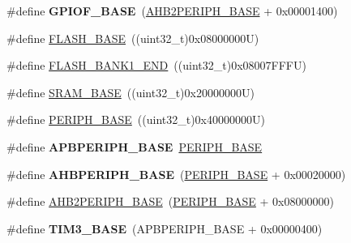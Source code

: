 \begin{DoxyCompactItemize}
\item 
\mbox{\label{group___peripheral__memory__map_ga7f9a3f4223a1a784af464a114978d26e}} 
\#define {\bfseries G\+P\+I\+O\+F\+\_\+\+B\+A\+SE}~(\hyperlink{group___peripheral__memory__map_gaeedaa71d22a1948492365e2cd26cfd46}{A\+H\+B2\+P\+E\+R\+I\+P\+H\+\_\+\+B\+A\+SE} + 0x00001400)
\item 
\#define \hyperlink{group___peripheral__memory__map_ga23a9099a5f8fc9c6e253c0eecb2be8db}{F\+L\+A\+S\+H\+\_\+\+B\+A\+SE}~((uint32\+\_\+t)0x08000000\+U)
\item 
\#define \hyperlink{group___peripheral__memory__map_ga443a2786535d83e32dfdc2b29e379332}{F\+L\+A\+S\+H\+\_\+\+B\+A\+N\+K1\+\_\+\+E\+ND}~((uint32\+\_\+t)0x08007\+F\+F\+F\+U)
\item 
\#define \hyperlink{group___peripheral__memory__map_ga05e8f3d2e5868754a7cd88614955aecc}{S\+R\+A\+M\+\_\+\+B\+A\+SE}~((uint32\+\_\+t)0x20000000\+U)
\item 
\#define \hyperlink{group___peripheral__memory__map_ga9171f49478fa86d932f89e78e73b88b0}{P\+E\+R\+I\+P\+H\+\_\+\+B\+A\+SE}~((uint32\+\_\+t)0x40000000\+U)
\item 
\mbox{\label{group___peripheral__memory__map_gac85f31889eb6a3f651b563bbc7131f91}} 
\#define {\bfseries A\+P\+B\+P\+E\+R\+I\+P\+H\+\_\+\+B\+A\+SE}~\hyperlink{group___peripheral__memory__map_ga9171f49478fa86d932f89e78e73b88b0}{P\+E\+R\+I\+P\+H\+\_\+\+B\+A\+SE}
\item 
\mbox{\label{group___peripheral__memory__map_ga92eb5d49730765d2abd0f5b09548f9f5}} 
\#define {\bfseries A\+H\+B\+P\+E\+R\+I\+P\+H\+\_\+\+B\+A\+SE}~(\hyperlink{group___peripheral__memory__map_ga9171f49478fa86d932f89e78e73b88b0}{P\+E\+R\+I\+P\+H\+\_\+\+B\+A\+SE} + 0x00020000)
\item 
\#define \hyperlink{group___peripheral__memory__map_gaeedaa71d22a1948492365e2cd26cfd46}{A\+H\+B2\+P\+E\+R\+I\+P\+H\+\_\+\+B\+A\+SE}~(\hyperlink{group___peripheral__memory__map_ga9171f49478fa86d932f89e78e73b88b0}{P\+E\+R\+I\+P\+H\+\_\+\+B\+A\+SE} + 0x08000000)
\item 
\mbox{\label{group___peripheral__memory__map_gaf0c34a518f87e1e505cd2332e989564a}} 
\#define {\bfseries T\+I\+M3\+\_\+\+B\+A\+SE}~(A\+P\+B\+P\+E\+R\+I\+P\+H\+\_\+\+B\+A\+SE + 0x00000400)

\end{DoxyCompactItemize}
